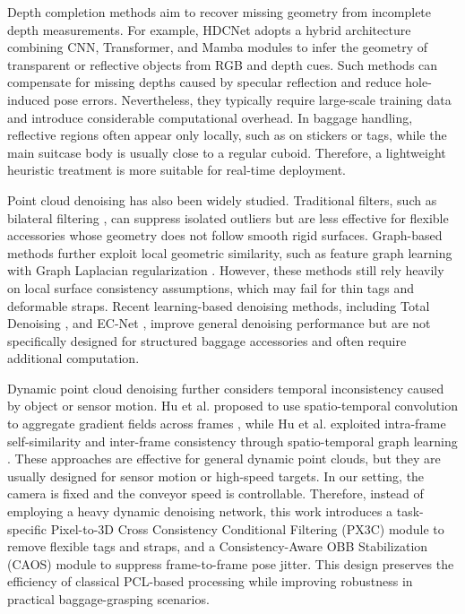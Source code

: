 Depth completion methods aim to recover missing geometry from incomplete depth measurements. For example, HDCNet \cite{xie2025hdcnet} adopts a hybrid architecture combining CNN, Transformer, and Mamba modules to infer the geometry of transparent or reflective objects from RGB and depth cues. Such methods can compensate for missing depths caused by specular reflection and reduce hole-induced pose errors. Nevertheless, they typically require large-scale training data and introduce considerable computational overhead. In baggage handling, reflective regions often appear only locally, such as on stickers or tags, while the main suitcase body is usually close to a regular cuboid. Therefore, a lightweight heuristic treatment is more suitable for real-time deployment.

Point cloud denoising has also been widely studied. Traditional filters, such as bilateral filtering \cite{digne2017bilateral, si2022lbf}, can suppress isolated outliers but are less effective for flexible accessories whose geometry does not follow smooth rigid surfaces. Graph-based methods further exploit local geometric similarity, such as feature graph learning with Graph Laplacian regularization \cite{hu2020feature}. However, these methods still rely heavily on local surface consistency assumptions, which may fail for thin tags and deformable straps. Recent learning-based denoising methods, including Total Denoising \cite{hermosilla2019total, rakotosaona2020pointcleannet}, and EC-Net \cite{yu2018ec}, improve general denoising performance but are not specifically designed for structured baggage accessories and often require additional computation.

Dynamic point cloud denoising further considers temporal inconsistency caused by object or sensor motion. Hu et al. proposed to use spatio-temporal convolution to aggregate gradient fields across frames \cite{hu2025dynamic}, while Hu et al. exploited intra-frame self-similarity and inter-frame consistency through spatio-temporal graph learning \cite{hu2021dynamic}. These approaches are effective for general dynamic point clouds, but they are usually designed for sensor motion or high-speed targets. In our setting, the camera is fixed and the conveyor speed is controllable. Therefore, instead of employing a heavy dynamic denoising network, this work introduces a task-specific Pixel-to-3D Cross Consistency Conditional Filtering (PX3C) module to remove flexible tags and straps, and a Consistency-Aware OBB Stabilization (CAOS) module to suppress frame-to-frame pose jitter. This design preserves the efficiency of classical PCL-based processing while improving robustness in practical baggage-grasping scenarios.


